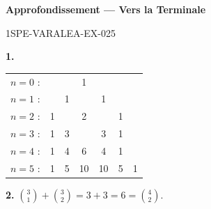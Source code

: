 \begin{center}\textbf{Approfondissement — Vers la Terminale}\end{center}
\begin{corrige}{1SPE-VARALEA-EX-025}

\textbf{1.}
\begin{center}
\begin{tabular}{ccccccc}
$n=0$ : & & & 1 & & & \\
$n=1$ : & & 1 & & 1 & & \\
$n=2$ : & 1 & & 2 & & 1 & \\
$n=3$ : & 1 & 3 & & 3 & 1 & \\
$n=4$ : & 1 & 4 & 6 & 4 & 1 & \\
$n=5$ : & 1 & 5 & 10 & 10 & 5 & 1
\end{tabular}
\end{center}

\medskip
\textbf{2.} $\binom{3}{1} + \binom{3}{2} = 3 + 3 = 6 = \binom{4}{2}$. \checkmark

\end{corrige}
